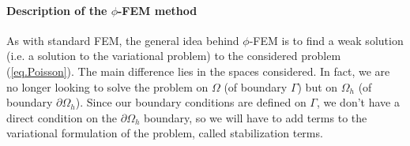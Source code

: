 \paragraph{Description of the $\phi$-FEM method}

As with standard FEM, the general idea behind $\phi$-FEM is to find a weak solution (i.e. a solution to the variational problem) to the considered problem (\ref{eq.Poisson}). The main difference lies in the spaces considered. In fact, we are no longer looking to solve the problem on $\Omega$ (of boundary $\Gamma$) but on $\Omega_h$ (of boundary $\partial\Omega_h$). Since our boundary conditions are defined on $\Gamma$, we don't have a direct condition on the $\partial\Omega_h$ boundary, so we will have to add terms to the variational formulation of the problem, called stabilization terms.

